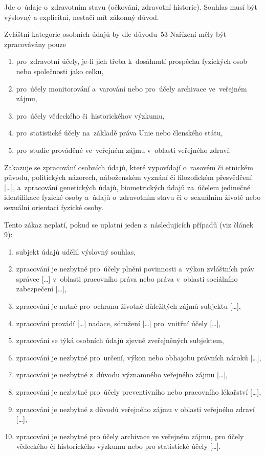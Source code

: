 Jde o~údaje o~zdravotním stavu (očkování, zdravotní historie).
Souhlas musí být výslovný a explicitní, nestačí mít zákonný důvod.

Zvláštní kategorie osobních údajů by dle důvodu~53 Nařízení měly být zpracovávány pouze

\begin{enumerate}[label=\alph*)]
\item pro~zdravotní účely, je-li jich třeba k~dosáhnutí prospěchu fyzických osob nebo společnosti jako celku,
\item pro~účely monitorování a~varování nebo pro~účely archivace ve~veřejném zájmu,
\item pro~účely vědeckého či~historickéhov výzkumu,
\item pro~statistické účely na~základě práva Unie nebo členského státu,
\item pro~studie prováděné ve~veřejném zájmu v~oblasti veřejného zdraví.
\end{enumerate}

Zakazuje se zpracování osobních údajů, které vypovídají o~rasovém či etnickém původu, politických názorech, náboženském vyznání či filozofickém přesvědčení [\dots], a~zpracování genetických údajů, biometrických údajů za~účelem jedinečné identifikace fyzické osoby a~údajů o~zdravotním stavu či o~sexuálním životě nebo sexuální orientaci fyzické osoby.

Tento zákaz neplatí, pokud se uplatní jeden z~následujících případů (viz článek 9):

\begin{enumerate}[label=\alph*)]
\item subjekt údajů udělil výslovný souhlas,
\item zpracování je nezbytné pro~účely plnění povinnosti a~výkon zvláštních práv správce [\dots] v~oblasti pracovního práva nebo práva v~oblasti sociálního zabezpečení [\dots],
\item zpracování je nutné pro~ochranu životně důležitých zájmů subjektu [\dots],
\item zpracování provádí [\dots] nadace, sdružení [\dots] pro~vnitřní účely [\dots],
\item zpracování se týká osobních údajů zjevně zveřejněných subjektem,
\item zpracování je nezbytné pro~určení, výkon nebo obhajobu právních nároků [\dots],
\item zpracování je nezbytné z~důvodu významného veřejného zájmu [\dots],
\item zpracování je nezbytné pro~účely preventivního nebo pracovního lékařství [\dots],
\item zpracování je nezbytné z důvodů veřejného zájmu v oblasti veřejného zdraví [\dots],
\item zpracování je nezbytné pro účely archivace ve veřejném zájmu, pro účely vědeckého či historického výzkumu nebo pro statistické účely [\dots].
\end{enumerate}

